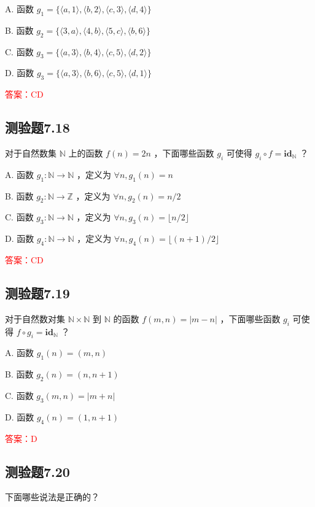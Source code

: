\documentclass[UTF8, heading=true]{ctexart}
\begin{document}
A. 函数 $g_1=\{\langle a, 1\rangle,\langle b, 2\rangle,\langle c, 3\rangle,\langle d, 4\rangle\}$

B. 函数 $g_2=\{\langle 3, a\rangle,\langle 4, b\rangle,\langle 5, c\rangle,\langle b, 6\rangle\}$

C. 函数 $g_3=\{\langle a, 3\rangle,\langle b, 4\rangle,\langle c, 5\rangle,\langle d, 2\rangle\}$

D. 函数 $g_3=\{\langle a, 3\rangle,\langle b, 6\rangle,\langle c, 5\rangle,\langle d, 1\rangle\}$


\textcolor{red}{答案：CD}

\subsection{测验题7.18}

对于自然数集 $\mathbb{N}$ 上的函数 $f(n)=2 n$ ，下面哪些函数 $g_i$ 可使得 $g_i \circ f=\mathbf{i d}_{\mathbb{N}}$ ？

A. 函数 $g_1: \mathbb{N} \rightarrow \mathbb{N}$ ，定义为 $\forall n, g_1(n)=n$

B. 函数 $g_2: \mathbb{N} \rightarrow \mathbb{Z}$ ，定义为 $\forall n, g_2(n)=n / 2$

C. 函数 $g_3: \mathbb{N} \rightarrow \mathbb{N}$ ，定义为 $\forall n, g_3(n)=\lfloor n / 2\rfloor$

D. 函数 $g_4: \mathbb{N} \rightarrow \mathbb{N}$ ，定义为 $\forall n, g_4(n)=\lfloor(n+1) / 2\rfloor$


\textcolor{red}{答案：CD}

\subsection{测验题7.19}

对于自然数对集 $\mathbb{N} \times \mathbb{N}$ 到 $\mathbb{N}$ 的函数 $f(m, n)=|m-n|$ ，下面哪些函数 $g_i$ 可使得 $f \circ g_i=\mathbf{i d}_{\mathbb{N}}$ ？

A. 函数 $g_1(n)=(m, n)$

B. 函数 $g_2(n)=(n, n+1)$

C. 函数 $g_3(m, n)=|m+n|$

D. 函数 $g_4(n)=(1, n+1)$


\textcolor{red}{答案：D}

\subsection{测验题7.20}

下面哪些说法是正确的？
\end{document}
